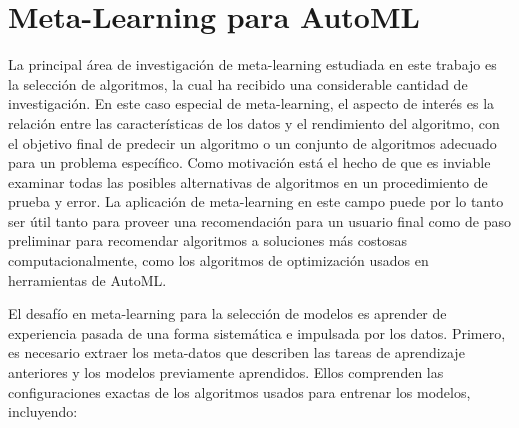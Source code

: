 %
%


\section{Meta-Learning para AutoML}\label{sec:metalearning-automl}


La principal área de investigación de meta-learning estudiada en este trabajo es la selección de algoritmos, la cual ha recibido una considerable cantidad de investigación. En este caso especial de meta-learning, el aspecto de interés es la relación entre las características de los datos y el rendimiento del algoritmo, con el objetivo final de predecir un algoritmo o un conjunto de algoritmos adecuado para un problema específico. Como motivación está el hecho de que es inviable examinar todas las posibles alternativas de algoritmos en un procedimiento de prueba y error. La aplicación de meta-learning en este campo puede por lo tanto ser útil tanto para proveer una recomendación para un usuario final como de paso preliminar para recomendar algoritmos a soluciones más costosas computacionalmente, como los algoritmos de optimización usados en herramientas de AutoML. 


El desafío en meta-learning para la selección de modelos es aprender de experiencia pasada de una forma sistemática e impulsada por los datos. Primero, es necesario extraer los meta-datos que describen las tareas de aprendizaje anteriores y los modelos previamente aprendidos. Ellos comprenden las configuraciones exactas de los algoritmos usados para entrenar los modelos, incluyendo:

